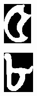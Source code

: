 \documentclass{standalone}
\begin{document}
\begin{figure}
\begin{subfigure}{0.15\textwidth}
\end{subfigure}
\begin{subfigure}{0.15\textwidth}
  \centering
  \includegraphics[width=0.8\linewidth]{./img/sample/stage13-6}
\end{subfigure}
\begin{subfigure}{0.15\textwidth}
  \centering
  \includegraphics[width=0.8\linewidth]{./img/sample/stage13-7}

\end{subfigure}
\end{figure}
\end{document}
